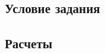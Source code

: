 \chapter{}
\label{ch:chap1}

\section{Условие задания}
\label{sec:cond1}

\section{Расчеты}
\label{sec:calc1}

\endinput